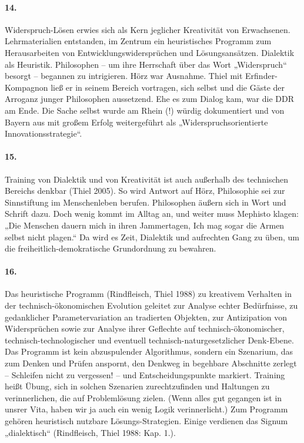 \documentclass[a4paper,11pt]{article}
\begin{document}
\paragraph{14.}
Widerspruch-Lösen erwies sich als Kern jeglicher Kreativität von Erwachsenen.
Lehrmaterialien entstanden, im Zentrum ein heuristisches Programm zum
Herausarbeiten von Entwicklungswidersprüchen und Lösungsansätzen.  Dialektik
als Heuristik.  Philosophen -- um ihre Herrschaft über das Wort „Widerspruch“
besorgt – begannen zu intrigieren. Hörz war Ausnahme. Thiel mit
Erfinder-Kompagnon ließ er in seinem Bereich vortragen, sich selbst und die
Gäste der Arroganz junger Philosophen aussetzend. Ehe es zum Dialog kam, war
die DDR am Ende. Die Sache selbst wurde am Rhein (!) würdig dokumentiert und
von Bayern aus mit großem Erfolg weitergeführt als „Widerspruchsorientierte
Innovationsstrategie“.

\paragraph{15.}
Training von Dialektik und von Kreativität ist auch außerhalb des technischen
Bereichs denkbar (Thiel 2005). So wird Antwort auf Hörz, Philosophie sei zur
Sinnstiftung im Menschenleben berufen. Philosophen äußern sich in Wort und
Schrift dazu.  Doch wenig kommt im Alltag an, und weiter muss Mephisto klagen:
„Die Menschen dauern mich in ihren Jammertagen, Ich mag sogar die Armen selbst
nicht plagen.“ Da wird es Zeit, Dialektik und aufrechten Gang zu üben, um die
freiheitlich-demokratische Grundordnung zu bewahren.

\paragraph{16.}
Das heuristische Programm (Rindfleisch, Thiel 1988) zu kreativem Verhalten in
der technisch-ökonomischen Evolution geleitet zur Analyse echter Bedürfnisse,
zu gedanklicher Parametervariation an tradierten Objekten, zur Antizipation
von Widersprüchen sowie zur Analyse ihrer Geflechte auf
technisch-ökonomischer, technisch-technologischer und eventuell
technisch-naturgesetzlicher Denk-Ebene. Das Programm ist kein abzuspulender
Algorithmus, sondern ein Szenarium, das zum Denken und Prüfen anspornt, den
Denkweg in begehbare Abschnitte zerlegt – Schleifen nicht zu vergessen! -- und
Entscheidungspunkte markiert. Training heißt Übung, sich in solchen Szenarien
zurechtzufinden und Haltungen zu verinnerlichen, die auf Problemlösung zielen.
(Wenn alles gut gegangen ist in unsrer Vita, haben wir ja auch ein wenig Logik
verinnerlicht.) Zum Programm gehören heuristisch nutzbare Lösungs-Strategien.
Einige verdienen das Signum „dialektisch“ (Rindfleisch, Thiel 1988: Kap. 1.).
\end{document}
